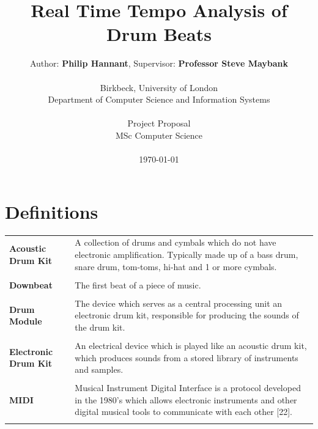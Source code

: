 \documentclass[a4paper, 11pt]{article}
\date{}
\begin{document}
 

\LARGE\title{Real Time Tempo Analysis of Drum Beats}

\LARGE\author{Author: \textbf{Philip Hannant}, Supervisor: \textbf{Professor Steve Maybank}\\
\\Birkbeck, University of London\\
Department of Computer Science and Information Systems\\
\\Project Proposal\\
MSc Computer Science\\
\\\monthyeardate\today
}





\normalsize


\maketitle
\newpage
\tableofcontents
\clearpage

\section*{Definitions}
\begin{tabular}{l p{4.5in}  }
\textbf{Acoustic Drum Kit} & A collection of drums and cymbals which do not have electronic amplification. Typically made up of a bass drum, snare drum, tom-toms, hi-hat and 1 or more cymbals.\\\\
\textbf{Downbeat} & The first beat of a piece of music.\\\\
\textbf{Drum Module} & The device which serves as a central processing unit an electronic drum kit, responsible for producing the sounds of the drum kit.\\\\
\textbf{Electronic Drum Kit} & An electrical device which is played like an acoustic drum kit, which produces sounds from a stored library of instruments and samples.\\\\
\textbf{MIDI} & Musical Instrument Digital Interface is a protocol developed in the 1980's which allows electronic instruments and other digital musical tools to communicate with each other [22].\\\\
\end{tabular}
\clearpage
\end{document}
